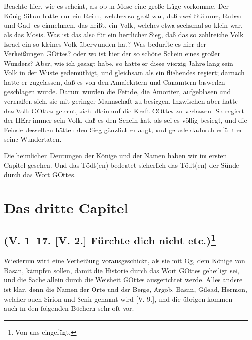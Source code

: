 Beachte hier, wie es scheint, als ob in Mose eine große Lüge vorkomme. Der König Sihon hatte nur ein Reich, welches so groß war, daß zwei Stämme, Ruben und Gad, es einnehmen, das heißt, ein Volk, welches etwa sechsmal so klein war, als das Mosis. Was ist das also für ein herrlicher Sieg, daß das so zahlreiche Volk Israel ein so kleines Volk überwunden hat? Was bedurfte es hier der Verheißungen GOttes? oder wo ist hier der so schöne Schein eines großen Wunders? Aber, wie ich gesagt habe, so hatte er diese vierzig Jahre lang sein Volk in der Wüste gedemüthigt, und gleichsam als ein fliehendes regiert; darnach hatte er zugelassen, daß es von den Amalekitern und Cananitern bisweilen geschlagen wurde. Darum wurden die Feinde, die Amoriter, aufgeblasen und vermaßen sich, sie mit geringer Mannschaft zu besiegen. Inzwischen aber hatte das Volk GOttes gelernt, sich allein auf die Kraft GOttes zu verlassen. So regiert der HErr immer sein Volk, daß es den Schein hat, als sei es völlig besiegt, und die Feinde desselben hätten den Sieg gänzlich erlangt, und gerade dadurch erfüllt er seine Wundertaten.

Die heimlichen Deutungen der Könige und der Namen haben wir im ersten Capitel gesehen. Und das Tödt(en) bedeutet sicherlich das Tödt(en) der Sünde durch das Wort GOttes.

\section{Das dritte Capitel}

\subsection[{(V. 1–17. [V. 2.] Fürchte dich nicht etc.)}]{(V. 1–17. [V. 2.] Fürchte dich nicht etc.)\footnote{Von uns eingefügt.}}

Wiederum wird eine Verheißung vorausgeschickt, als sie mit Og, dem Könige von Basan, kämpfen sollen, damit die Historie durch das Wort GOttes geheiligt sei, und die Sache allein durch die Weisheit GOttes ausgerichtet werde. Alles andere ist klar, denn die Namen der Orte und der Berge, Argob, Basan, Gilead, Hermon, welcher auch Sirion und Senir genannt wird [V. 9.], und die übrigen kommen auch in den folgenden Büchern sehr oft vor.

